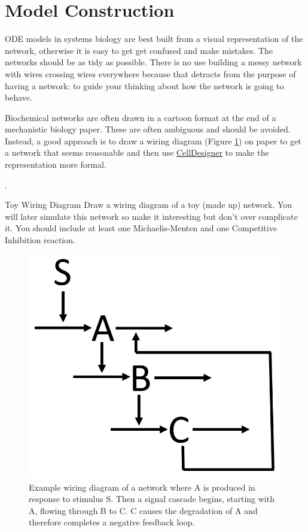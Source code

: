 \documentclass[../../main]{subfiles}
\begin{document}
    \section{Model Construction}
    ODE models in systems biology are best built from a visual representation of the network, otherwise it
    is easy to get get confused and make mistakes. The networks should be as tidy as possible. There is no use
    building a messy network with wires crossing wires everywhere because that detracts from the
    purpose of having a network: to guide your thinking about how the network is going to behave.

    Biochemical networks are often drawn in a cartoon format at the end of a mechanistic biology paper. These are often
    ambiguous and should be avoided. Instead, a good approach is to draw a wiring diagram (Figure \ref{fig:model_construction:wiring_diagram})
    on paper to get a network that seems reasonable and then use \href{http://www.celldesigner.org/}{CellDesigner} to make the representation
    more formal.

    .


    \begin{Task}[label=ToyWiringDiagram]{Toy Wiring Diagram}
        Draw a wiring diagram of a toy (made up) network. You will later simulate this network so make it interesting
        but don't over complicate it. You should include at least one Michaelis-Menten and one Competitive Inhibition
        reaction.
    \end{Task}

    \begin{figure}[t]
        \centering
        \includegraphics[width=0.5\linewidth]{ODEModels/ModelConstruction/assets/wiring_diagram.png}
        \caption[wiring diagram]{Example wiring diagram of a network where A is produced in response to stimulus S.
        Then a signal cascade begins, starting with A, flowing through B to C. C causes the degradation of A and
        therefore completes a negative feedback loop.}
        \label{fig:model_construction:wiring_diagram}
    \end{figure}
\end{document}
